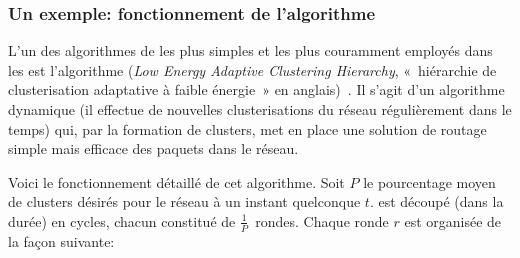         \subsubsection{Un exemple: fonctionnement de l'algorithme \leach}%
        \label{st:subsubsec:leach}
        L'un des algorithmes de  les plus simples et les plus couramment employés dans les \rcsfs est l'algorithme \leach (\textit{Low Energy Adaptive Clustering Hierarchy}, \cad « hiérarchie de clusterisation adaptative à faible énergie » en anglais)~\cite{HCB00}.
Il s'agit d'un algorithme dynamique (il effectue de nouvelles clusterisations du réseau régulièrement dans le temps) qui, par la formation de clusters, met en place une solution de routage simple mais efficace des paquets dans le réseau.

Voici le fonctionnement détaillé de cet algorithme.
Soit $P$ le pourcentage moyen de clusters désirés pour le réseau à un instant quelconque $t$.
\leach est découpé (dans la durée) en cycles, chacun constitué de $\frac{1}{P}$~rondes.
Chaque ronde $r$ est organisée de la façon suivante:
